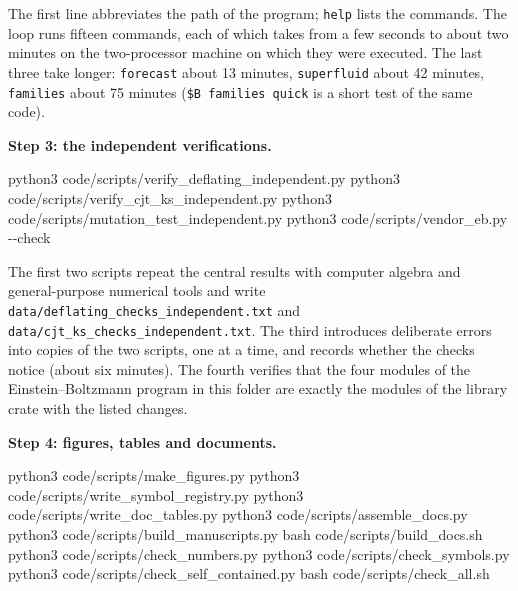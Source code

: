 \documentclass[
  10pt,
]{article}
\newenvironment{Shaded}{}{}
\newcommand{\AttributeTok}[1]{\textcolor[rgb]{0.49,0.56,0.16}{#1}}
\newcommand{\ExtensionTok}[1]{#1}
\newcommand{\FunctionTok}[1]{\textcolor[rgb]{0.02,0.16,0.49}{#1}}
\newcommand{\NormalTok}[1]{#1}
\begin{document}
The first line abbreviates the path of the program; \texttt{help} lists
the commands. The loop runs fifteen commands, each of which takes from a
few seconds to about two minutes on the two-processor machine on which
they were executed. The last three take longer: \texttt{forecast} about
13 minutes, \texttt{superfluid} about 42 minutes, \texttt{families}
about 75 minutes (\texttt{\$B\ families\ quick} is a short test of the
same code).

\textbf{Step 3: the independent verifications.}

\begin{Shaded}
\begin{Highlighting}[]
\ExtensionTok{python3}\NormalTok{ code/scripts/verify\_deflating\_independent.py}
\ExtensionTok{python3}\NormalTok{ code/scripts/verify\_cjt\_ks\_independent.py}
\ExtensionTok{python3}\NormalTok{ code/scripts/mutation\_test\_independent.py}
\ExtensionTok{python3}\NormalTok{ code/scripts/vendor\_eb.py }\AttributeTok{{-}{-}check}
\end{Highlighting}
\end{Shaded}

The first two scripts repeat the central results with computer algebra
and general-purpose numerical tools and write
\texttt{data/deflating\_checks\_independent.txt} and
\texttt{data/cjt\_ks\_checks\_independent.txt}. The third introduces
deliberate errors into copies of the two scripts, one at a time, and
records whether the checks notice (about six minutes). The fourth
verifies that the four modules of the Einstein--Boltzmann program in
this folder are exactly the modules of the library crate with the listed
changes.

\textbf{Step 4: figures, tables and documents.}

\begin{Shaded}
\begin{Highlighting}[]
\ExtensionTok{python3}\NormalTok{ code/scripts/make\_figures.py}
\ExtensionTok{python3}\NormalTok{ code/scripts/write\_symbol\_registry.py}
\ExtensionTok{python3}\NormalTok{ code/scripts/write\_doc\_tables.py}
\ExtensionTok{python3}\NormalTok{ code/scripts/assemble\_docs.py}
\ExtensionTok{python3}\NormalTok{ code/scripts/build\_manuscripts.py}
\FunctionTok{bash}\NormalTok{    code/scripts/build\_docs.sh}
\ExtensionTok{python3}\NormalTok{ code/scripts/check\_numbers.py}
\ExtensionTok{python3}\NormalTok{ code/scripts/check\_symbols.py}
\ExtensionTok{python3}\NormalTok{ code/scripts/check\_self\_contained.py}
\FunctionTok{bash}\NormalTok{    code/scripts/check\_all.sh}
\end{Highlighting}
\end{Shaded}
\end{document}
